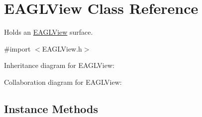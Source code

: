 \hypertarget{interface_e_a_g_l_view}{\section{E\+A\+G\+L\+View Class Reference}
\label{interface_e_a_g_l_view}
}


Holds an \hyperlink{interface_e_a_g_l_view}{E\+A\+G\+L\+View} surface.  




{\ttfamily \#import $<$E\+A\+G\+L\+View.\+h$>$}



Inheritance diagram for E\+A\+G\+L\+View\+:


Collaboration diagram for E\+A\+G\+L\+View\+:
\subsection*{Instance Methods}
